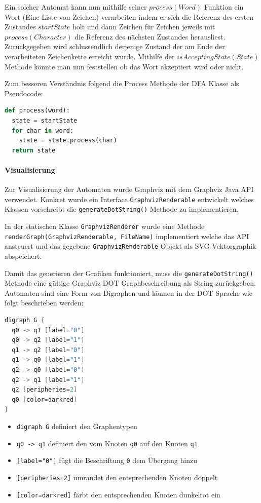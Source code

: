 Ein solcher Automat kann nun mithilfe seiner $process(Word)$ Funktion ein Wort (Eine Liste von Zeichen) verarbeiten indem er sich die Referenz des ersten Zustandes $startState$ holt und dann Zeichen für Zeichen jeweils mit $process(Character)$ die Referenz des nächsten Zustandes herausliest. Zurückgegeben wird schlussendlich derjenige Zustand der am Ende der verarbeiteten Zeichenkette erreicht wurde. Mithilfe der $isAcceptingState(State)$ Methode könnte man nun feststellen ob das Wort akzeptiert wird oder nicht. 

Zum besseren Verständnis folgend die Process Methode der DFA Klasse als Pseudocode:

\begin{lstlisting}[language=Python, caption={Process Methode der DFA Klasse}]
def process(word):
  state = startState
  for char in word:
    state = state.process(char)
  return state
\end{lstlisting}

\paragraph{Visualisierung}
Zur Visualisierung der Automaten wurde Graphviz \cite{graphviz} mit dem Graphviz Java API \cite{graphvizjava} verwendet. Konkret wurde ein Interface \lstinline$GraphvizRenderable$ entwickelt welches Klassen vorschreibt die \lstinline$generateDotString()$ Methode zu implementieren.

In der statischen Klasse \lstinline$GraphvizRenderer$ wurde eine Methode \lstinline$renderGraph(GraphvizRenderable, FileName)$ implementiert welche das API ansteuert und das gegebene \lstinline$GraphvizRenderable$ Objekt als SVG Vektorgraphik abspeichert.

Damit das generieren der Grafiken funktioniert, muss die \lstinline$generateDotString()$ Methode eine gültige Graphviz DOT Graphbeschreibung als String zurückgeben. Automaten sind eine Form von Digraphen und können in der DOT Sprache wie folgt beschrieben werden:

\begin{lstlisting}[language=Java, caption={Automat in DOT Sprache}, label={lst:dot_language}]
digraph G {
  q0 -> q1 [label="0"]
  q0 -> q2 [label="1"]
  q1 -> q2 [label="0"]
  q1 -> q0 [label="1"]
  q2 -> q0 [label="0"]
  q2 -> q1 [label="1"]
  q2 [peripheries=2]
  q0 [color=darkred]
}
\end{lstlisting}

\begin{itemize}
  \item \lstinline$digraph G$ definiert den Graphentypen
  \item \lstinline$q0 -> q1$ definiert den vom Knoten \lstinline$q0$ auf den Knoten \lstinline$q1$
  \item \lstinline$[label="0"]$ fügt die Beschriftung \lstinline$0$ dem Übergang hinzu
  \item \lstinline$[peripheries=2]$ umrandet den entsprechenden Knoten doppelt
  \item \lstinline$[color=darkred]$ färbt den entsprechenden Knoten dunkelrot ein
\end{itemize}

